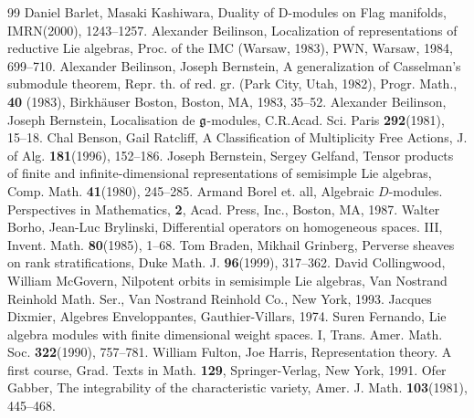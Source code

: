 \documentclass[12pt]{amsart}
\theoremstyle{definition}\newtheorem{theorem}{Theorem}[section]
\theoremstyle{definition}\newtheorem{definition}[proposition]{Definition}
\theoremstyle{remark}\newtheorem{example}[proposition]{Example}
\begin{document}
\newpage\begin{thebibliography}{99}
 Daniel Barlet, Masaki Kashiwara, Duality of D-modules on Flag manifolds, IMRN(2000), 1243--1257.
 Alexander Beilinson, Localization of representations of reductive Lie algebras,  Proc. of the IMC (Warsaw, 1983), PWN, Warsaw, 1984, 699--710.
Alexander Beilinson, Joseph Bernstein, A generalization of Casselman's submodule theorem,  Repr. th. of red. gr. (Park City, Utah, 1982),  Progr. Math., {\bf40} (1983), Birkh\"auser Boston, Boston, MA, 1983, 35--52.
 Alexander Beilinson, Joseph Bernstein, Localisation de $\frak g$-modules, C.R.Acad. Sci. Paris {\bf 292}(1981), 15--18.
 Chal Benson, Gail Ratcliff, A Classification of Multiplicity Free Actions, J. of Alg. {\bf181}(1996), 152--186.
 Joseph Bernstein, Sergey Gelfand, Tensor products of finite and infinite-dimensional representations of semisimple Lie algebras, Comp. Math. {\bf41}(1980), 245--285.
Armand Borel et. all, Algebraic $D$-modules. Perspectives in Mathematics, {\bf2}, Acad. Press, Inc., Boston, MA, 1987.
 Walter Borho, Jean-Luc Brylinski, Differential operators on homogeneous spaces. III, Invent. Math. {\bf80}(1985), 1--68.
 Tom Braden, Mikhail Grinberg, Perverse sheaves on rank stratifications, Duke Math. J. {\bf96}(1999), 317--362.
 David Collingwood, William McGovern, Nilpotent orbits in semisimple Lie algebras, Van Nostrand Reinhold Math. Ser., Van Nostrand Reinhold Co., New York, 1993.
 Jacques Dixmier, Algebres Enveloppantes, Gauthier-Villars, 1974.
 Suren Fernando, Lie algebra modules with finite dimensional weight spaces. I, Trans. Amer. Math. Soc. {\bf322}(1990), 757--781.
 William Fulton, Joe Harris, Representation theory. A first course, Grad. Texts in Math. {\bf129}, Springer-Verlag, New York, 1991.
 Ofer Gabber, The integrability of the characteristic variety, Amer. J. Math. {\bf103}(1981), 445--468.

\end{thebibliography}
\end{document}
